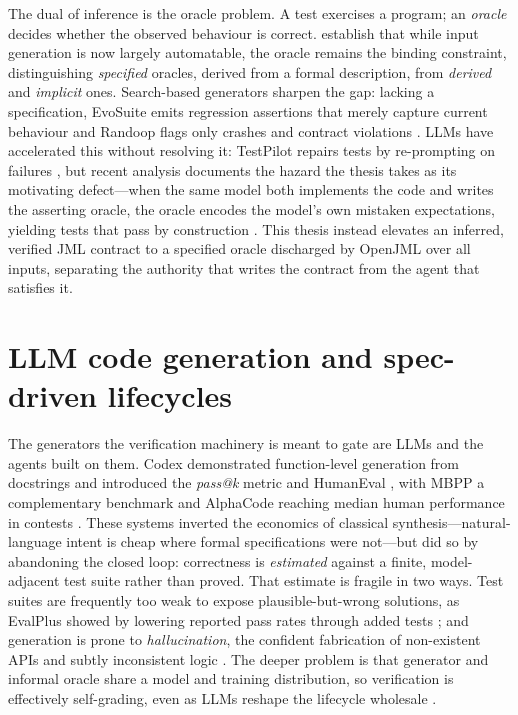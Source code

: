 The dual of inference is the oracle problem. A test exercises a program; an
\emph{oracle} decides whether the observed behaviour is correct.
\citet{barr2015oracle} establish that while input generation is now largely
automatable, the oracle remains the binding constraint, distinguishing
\emph{specified} oracles, derived from a formal description, from \emph{derived} and
\emph{implicit} ones. Search-based generators sharpen the gap: lacking a
specification, EvoSuite emits regression assertions that merely capture current
behaviour \cite{fraser2011evosuite} and Randoop flags only crashes and contract
violations \cite{pacheco2007randoop}. LLMs have accelerated this without resolving
it: TestPilot repairs tests by re-prompting on failures \cite{schafer2024testpilot},
but recent analysis documents the hazard the thesis takes as its motivating
defect---when the same model both implements the code and writes the asserting
oracle, the oracle encodes the model's own mistaken expectations, yielding tests
that pass by construction \cite{liu2026oracle}. This thesis instead
elevates an inferred, verified JML contract to a specified oracle discharged by
OpenJML over all inputs, separating the authority that writes the contract from the
agent that satisfies it.

\section{LLM code generation and spec-driven lifecycles}\label{sec:bg-llm}

The generators the verification machinery is meant to gate are LLMs and the agents
built on them. Codex demonstrated function-level generation from docstrings and
introduced the \emph{pass@k} metric and HumanEval \cite{chen2021codex}, with MBPP a
complementary benchmark \cite{austin2021mbpp} and AlphaCode reaching median human
performance in contests \cite{li2022alphacode}. These systems inverted the
economics of classical synthesis---natural-language intent is cheap where formal
specifications were not---but did so by abandoning the closed loop: correctness is
\emph{estimated} against a finite, model-adjacent test suite rather than proved.
That estimate is fragile in two ways. Test suites are frequently too weak to expose
plausible-but-wrong solutions, as EvalPlus showed by lowering reported pass rates
through added tests \cite{liu2023evalplus}; and generation is prone to
\emph{hallucination}, the confident fabrication of non-existent APIs and subtly
inconsistent logic \cite{zhang2025hallucination}. The deeper problem is that
generator and informal oracle share a model and training distribution, so
verification is effectively self-grading, even as LLMs reshape the lifecycle
wholesale \cite{ozkaya2023llmse}.

